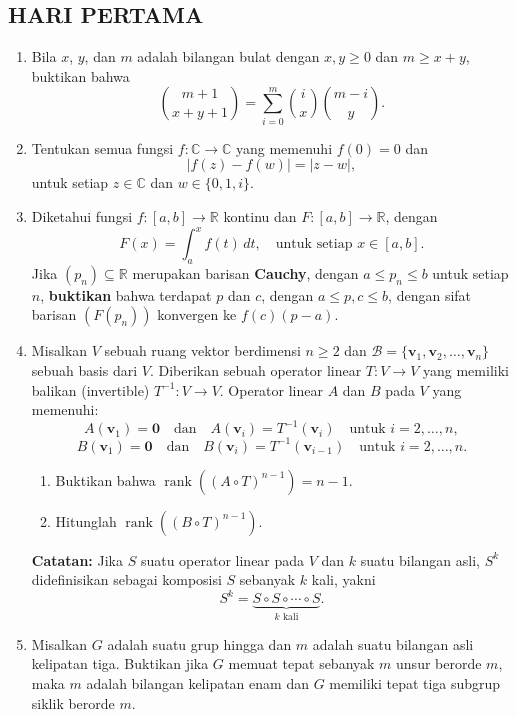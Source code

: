 \documentclass[12pt,twoside]{article}
\begin{document}
\subsection{HARI PERTAMA}
\begin{enumerate}
    \item Bila $x$, $y$, dan $m$ adalah bilangan bulat dengan $x, y \geq 0$ dan $m \geq x + y$, buktikan bahwa
          \[
              \binom{m + 1}{x + y + 1} = \sum_{i = 0}^{m} \binom{i}{x} \binom{m - i}{y}.
          \]

    \item Tentukan semua fungsi $f : \mathbb{C} \to \mathbb{C}$ yang memenuhi $f(0) = 0$ dan
          \[
              |f(z) - f(w)| = |z - w|,
          \]
          untuk setiap $z \in \mathbb{C}$ dan $w \in \{0, 1, i\}$.

    \item Diketahui fungsi $f : [a, b] \to \mathbb{R}$ kontinu dan $F : [a, b] \to \mathbb{R}$, dengan
          \[
              F(x) = \int_a^x f(t) \, dt, \quad \text{untuk setiap } x \in [a, b].
          \]
          Jika $(p_n) \subseteq \mathbb{R}$ merupakan barisan \textbf{Cauchy}, dengan $a \leq p_n \leq b$ untuk setiap $n$, \textbf{buktikan} bahwa terdapat $p$ dan $c$, dengan $a \leq p, c \leq b$, dengan sifat barisan $(F(p_n))$ konvergen ke $f(c)(p - a)$.

    \item Misalkan $V$ sebuah ruang vektor berdimensi $n \geq 2$ dan $\mathcal{B} = \{\mathbf{v}_1, \mathbf{v}_2, \ldots, \mathbf{v}_n\}$ sebuah basis dari $V$. Diberikan sebuah operator linear $T : V \to V$ yang memiliki balikan (invertible) $T^{-1} : V \to V$. Operator linear $A$ dan $B$ pada $V$ yang memenuhi:
          \[
              A(\mathbf{v}_1) = \mathbf{0} \quad \text{dan} \quad A(\mathbf{v}_i) = T^{-1}(\mathbf{v}_{i}) \quad \text{untuk } i = 2, \dots, n,
          \]
          \[
              B(\mathbf{v}_1) = \mathbf{0} \quad \text{dan} \quad B(\mathbf{v}_i) = T^{-1}(\mathbf{v}_{i-1}) \quad \text{untuk } i = 2, \dots, n.
          \]
          \begin{enumerate}
              \item Buktikan bahwa $\operatorname{rank}((A \circ T)^{n - 1}) = n - 1$.
              \item Hitunglah $\operatorname{rank}((B \circ T)^{n - 1})$.
          \end{enumerate}

          \textbf{Catatan:} Jika $S$ suatu operator linear pada $V$ dan $k$ suatu bilangan asli, $S^k$ didefinisikan sebagai komposisi $S$ sebanyak $k$ kali, yakni
          \[
              S^k = \underbrace{S \circ S \circ \cdots \circ S}_{k \text{ kali}}.
          \]

    \item Misalkan $G$ adalah suatu grup hingga dan $m$ adalah suatu bilangan asli kelipatan tiga. Buktikan jika $G$ memuat tepat sebanyak $m$ unsur berorde $m$, maka $m$ adalah bilangan kelipatan enam dan $G$ memiliki tepat tiga subgrup siklik berorde $m$.
\end{enumerate}
\pagebreak
\end{document}
